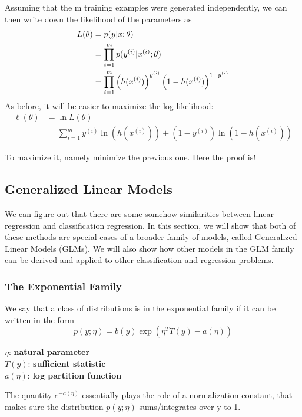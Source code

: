\documentclass[fontset=windows,pass]{article}
\numberwithin{equation}{subsection} %
\begin{document}
Assuming that the m training examples were generated independently, we can then write down the likelihood 
of the parameters as
\begin{equation*}
	\begin{aligned}
		L(\theta) & = p(y \arrowvert x;\theta)\\
		          & = \prod_{i=1}^{m} p(y^{(i)} \arrowvert x^{(i)};\theta)\\
				  & = \prod_{i=1}^{m} \left(h(x^{(i)})\right)^{y^{(i)}} \left(1-h(x^{(i)})\right)^{1-y^{(i)}}
	\end{aligned}
\end{equation*}
As before, it will be easier to maximize the log likelihood:
\begin{equation*}
	\begin{aligned}
		\ell(\theta) & = \ln L(\theta)\\
		             & = \sum_{i=1}^{m} y^{(i)}\ln(h(x^{(i)})) + (1-y^{(i)})\ln(1-h(x^{(i)}))
	\end{aligned}
\end{equation*}

To maximize it, namely minimize the previous one. Here the proof is!

\subsection{Generalized Linear Models}
We can figure out that there are some somehow similarities between linear regression and classification regression. In this section, we will
show  that both of these methods are special cases of a broader family of models, called Generalized Linear Models (GLMs). We will also show 
how other models in the GLM family can be derived and applied to other classification and regression problems.

\subsubsection{The Exponential Family}
We say that a class of distributions is in the exponential family if it can be written in the form
\begin{equation}
	p(y;\eta) = b(y) \exp\left(\eta^{T}T(y) - a(\eta)\right)
\end{equation}

\begin{center}
	$\eta$: \textbf{natural parameter}\\
	$T(y)$: \textbf{sufficient statistic}\\
	$a(\eta)$: \textbf{log partition function}
\end{center}
The quantity $e^{-a(\eta)}$ essentially plays the role of a normalization constant, that makes sure the distribution 
$p(y;\eta)$ sums/integrates over y to 1.
\end{document}
